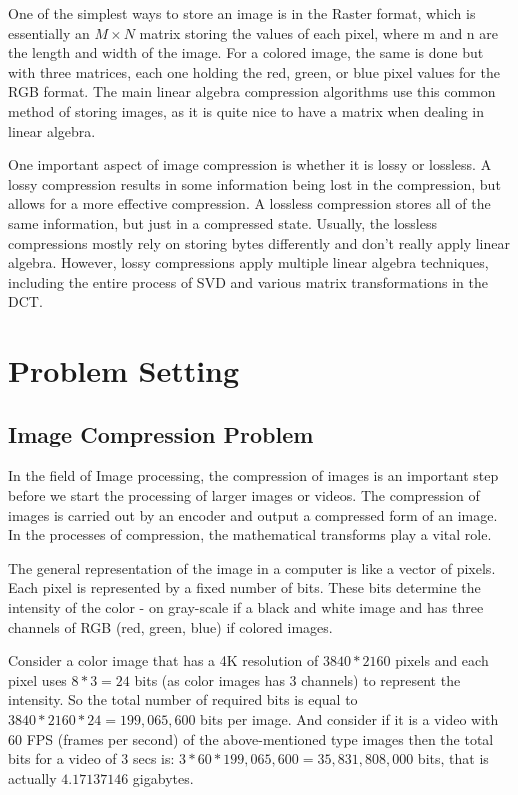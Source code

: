 One of the simplest ways to store an image is in the Raster format, which is essentially an
$M \times N$ matrix storing the values of each pixel, where m and n are the length and width of the
image. For a colored image, the same is done but with three matrices, each one holding the red,
green, or blue pixel values for the RGB format. The main linear algebra compression algorithms
use this common method of storing images, as it is quite nice to have a matrix when dealing in
linear algebra.

One important aspect of image compression is whether it is lossy or lossless. A lossy
compression results in some information being lost in the compression, but allows for a more
effective compression. A lossless compression stores all of the same information, but just in a
compressed state. Usually, the lossless compressions mostly rely on storing bytes differently and
don’t really apply linear algebra. However, lossy compressions apply multiple linear algebra
techniques, including the entire process of SVD and various matrix transformations in the DCT.

\section{Problem Setting}

\subsection{Image Compression Problem}

In the field of Image processing, the compression of images is an important step before we start the processing of larger images or videos. The compression of images is carried out by an encoder and output a compressed form of an image. In the processes of compression, the mathematical transforms play a vital role. 

The general representation of the image in a computer is like a vector of pixels. Each pixel is represented by a fixed number of bits. These bits determine the intensity of the color - on gray-scale if a black and white image and has three channels of RGB (red, green, blue) if colored images.

Consider a color image that has a 4K resolution of $3840 * 2160$ pixels and each pixel uses $8 * 3 = 24$ bits (as color images has 3 channels) to represent the intensity. So the total number of required bits  is equal to $3840 * 2160 * 24 = 199,065,600$ bits per image. And consider if it is a video with 60 FPS (frames per second) of the above-mentioned type images then the total bits for a video of 3 secs is: $3 * 60 * 199,065,600 = 35,831,808,000$ bits, that is actually $4.17137146$ gigabytes. 

